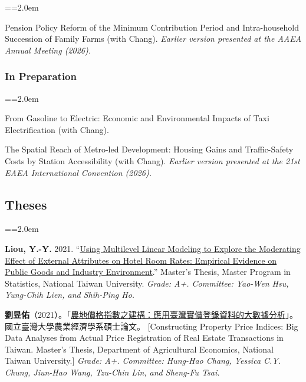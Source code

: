 \documentclass[11pt,letterpaper]{article}
\newenvironment{hanglist}{\par\setlength{\parindent}{0pt}\everypar={\hangindent=2.0em\hangafter=1}}{\par}
\begin{document}
\begin{hanglist}

Pension Policy Reform of the Minimum Contribution Period and Intra-household Succession of Family Farms (with Chang). \newline \textit{Earlier version presented at the AAEA Annual Meeting (2026).}

\end{hanglist}

\hypertarget{in-preparation}{%
\subsubsection{In Preparation}\label{in-preparation}}

\begin{hanglist}

From Gasoline to Electric: Economic and Environmental Impacts of Taxi Electrification (with Chang).

The Spatial Reach of Metro-led Development: Housing Gains and Traffic-Safety Costs by Station Accessibility (with Chang). \newline \textit{Earlier version presented at the 21st EAEA International Convention (2026).}

\end{hanglist}

\hypertarget{theses}{%
\subsection{Theses}\label{theses}}

\begin{hanglist}

\textbf{Liou, Y.-Y.} 2021. ``\href{https://doi.org/10.6342/NTU202102085}{Using Multilevel Linear Modeling to Explore the Moderating Effect of External Attributes on Hotel Room Rates: Empirical Evidence on Public Goods and Industry Environment}.'' Master's Thesis, Master Program in Statistics, National Taiwan University. \newline \textit{Grade: A+. Committee: Yao-Wen Hsu, Yung-Chih Lien, and Shih-Ping Ho.}

\textbf{劉昱佑}（2021）。「\href{https://doi.org/10.6342/NTU202101981}{農地價格指數之建構：應用臺灣實價登錄資料的大數據分析}」。國立臺灣大學農業經濟學系碩士論文。 \newline{} {[}Constructing Property Price Indices: Big Data Analyses from Actual Price Registration of Real Estate Transactions in Taiwan. Master's Thesis, Department of Agricultural Economics, National Taiwan University.{]} \newline \textit{Grade: A+. Committee: Hung-Hao Chang, Yessica C.Y. Chung, Jiun-Hao Wang, Tzu-Chin Lin, and Sheng-Fu Tsai.}

\end{hanglist}
\end{document}
